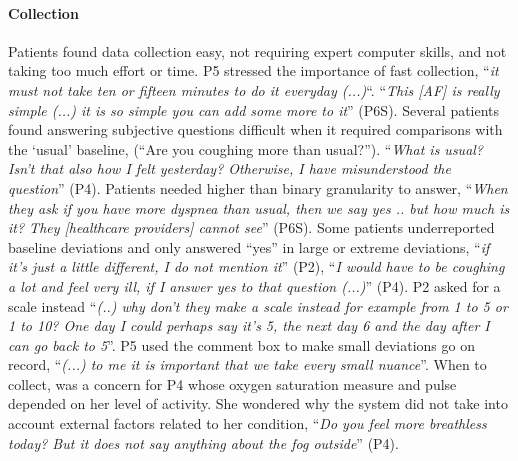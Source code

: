 \paragraph{Collection} 
Patients found data collection easy, not requiring expert computer skills, and not taking too much effort or time. P5 stressed the importance of fast collection, “\textit{it must not take ten or fifteen minutes to do it everyday (...)}“. “\textit{This [AF] is really simple (...) it is so simple you can add some more to it}” (P6S). Several patients found answering subjective questions difficult when it required comparisons with the ‘usual’ baseline, (“Are you coughing more than usual?”). “\textit{What is usual? Isn’t that also how I felt yesterday? Otherwise, I have misunderstood the question}” (P4). Patients needed higher than binary granularity to answer, “\textit{When they ask if you have more dyspnea than usual, then we say yes .. but how much is it? They [healthcare providers] cannot see}” (P6S). Some patients underreported baseline deviations and only answered “yes” in large or extreme deviations, “\textit{if it’s just a little different, I do not mention it}” (P2),  “\textit {I would have to be coughing a lot and feel very ill, if I answer yes to that question (...)}” (P4). P2 asked for a scale instead “\textit{(..) why don’t they make a scale instead for example from 1 to 5 or 1 to 10? One day I could perhaps say it’s 5, the next day 6 and the day after I can go back to 5}”. P5 used the comment box to make small deviations go on record, “\textit{(...) to me it is important that we take every small nuance}”.  When to collect, was a concern for P4 whose oxygen saturation measure and pulse depended on her level of activity. She wondered why the system did not take into account external factors related to her condition, “\textit{Do you feel more breathless today? But it does not say anything about the fog outside}” (P4). 

